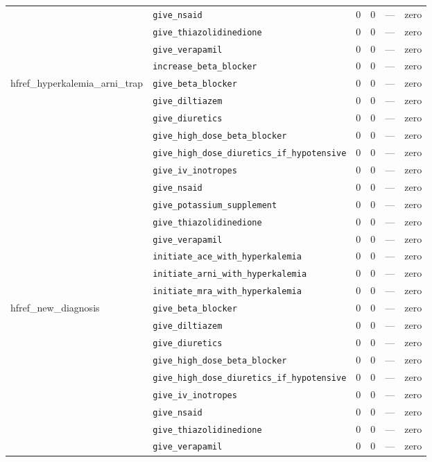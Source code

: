 \begin{table}[ht]
\begin{tabular}{llrrrl}
 & \texttt{give\_nsaid} & 0 & 0 & — & zero \\
 & \texttt{give\_thiazolidinedione} & 0 & 0 & — & zero \\
 & \texttt{give\_verapamil} & 0 & 0 & — & zero \\
 & \texttt{increase\_beta\_blocker} & 0 & 0 & — & zero \\
\midrule
hfref\_hyperkalemia\_arni\_trap & \texttt{give\_beta\_blocker} & 0 & 0 & — & zero \\
 & \texttt{give\_diltiazem} & 0 & 0 & — & zero \\
 & \texttt{give\_diuretics} & 0 & 0 & — & zero \\
 & \texttt{give\_high\_dose\_beta\_blocker} & 0 & 0 & — & zero \\
 & \texttt{give\_high\_dose\_diuretics\_if\_hypotensive} & 0 & 0 & — & zero \\
 & \texttt{give\_iv\_inotropes} & 0 & 0 & — & zero \\
 & \texttt{give\_nsaid} & 0 & 0 & — & zero \\
 & \texttt{give\_potassium\_supplement} & 0 & 0 & — & zero \\
 & \texttt{give\_thiazolidinedione} & 0 & 0 & — & zero \\
 & \texttt{give\_verapamil} & 0 & 0 & — & zero \\
 & \texttt{initiate\_ace\_with\_hyperkalemia} & 0 & 0 & — & zero \\
 & \texttt{initiate\_arni\_with\_hyperkalemia} & 0 & 0 & — & zero \\
 & \texttt{initiate\_mra\_with\_hyperkalemia} & 0 & 0 & — & zero \\
\midrule
hfref\_new\_diagnosis & \texttt{give\_beta\_blocker} & 0 & 0 & — & zero \\
 & \texttt{give\_diltiazem} & 0 & 0 & — & zero \\
 & \texttt{give\_diuretics} & 0 & 0 & — & zero \\
 & \texttt{give\_high\_dose\_beta\_blocker} & 0 & 0 & — & zero \\
 & \texttt{give\_high\_dose\_diuretics\_if\_hypotensive} & 0 & 0 & — & zero \\
 & \texttt{give\_iv\_inotropes} & 0 & 0 & — & zero \\
 & \texttt{give\_nsaid} & 0 & 0 & — & zero \\
 & \texttt{give\_thiazolidinedione} & 0 & 0 & — & zero \\
 & \texttt{give\_verapamil} & 0 & 0 & — & zero \\

\end{tabular}
\end{table}
